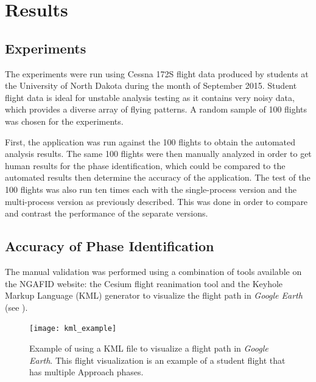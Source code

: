 
\chapter{Results} \label{ch:results}

\section{Experiments}

	The experiments were run using Cessna 172S flight data produced by students at the University of North Dakota during the month of September 2015.  Student flight data is ideal for unstable analysis testing as it contains very noisy data, which provides a diverse array of flying patterns.  A random sample of 100 flights was chosen for the experiments.
        
    First, the application was run against the 100 flights to obtain the automated analysis results.  The same 100 flights were then manually analyzed in order to get human results for the phase identification, which could be compared to the automated results then determine the accuracy of the application.  The test of the 100 flights was also run ten times each with the single-process version and the multi-process version as previously described.  This was done in order to compare and contrast the performance of the separate versions.


\section{Accuracy of Phase Identification}

	The manual validation was performed using a combination of tools available on the NGAFID website:  the Cesium flight reanimation tool and the Keyhole Markup Language (KML) generator to visualize the flight path in \textit{Google Earth}~\cite{nolan2014keyhole} (see ).
    
    \begin{figure}
    	\centering
        \texttt{[image: kml\_example]}
        \caption{Example of using a KML file to visualize a flight path in \textit{Google Earth}.  This flight visualization is an example of a student flight that has multiple Approach phases.}
        \label{fig:kml_example}
    \end{figure}
    
